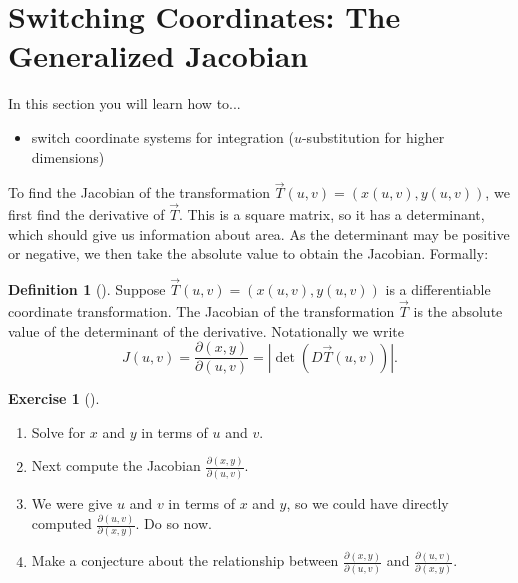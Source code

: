 \documentclass[10pt,]{book}
\theoremstyle{plain}
\theoremstyle{definition}
\newtheorem{definition}[theorem]{Definition}
\theoremstyle{definition}
\theoremstyle{definition}
\theoremstyle{definition}
\newtheorem{exploration}[project]{Exercise}
\theoremstyle{definition}
\numberwithin{equation}{section}
\begin{document}
\section[{Switching Coordinates: The Generalized Jacobian}]{Switching Coordinates: The Generalized Jacobian}\label{section-40}
In this section you will learn how to... \leavevmode%
\begin{itemize}[label=\textbullet]
\item{}switch coordinate systems for integration (\(u\)-substitution for higher dimensions)%
\end{itemize}
%
\par
To find the Jacobian of the transformation \(\vec T(u,v)=(x(u,v), y(u,v))\), we first find the derivative of \(\vec T\). This is a square matrix, so it has a determinant, which should give us information about area. As the determinant may be positive or negative, we then take the absolute value to obtain the Jacobian. Formally:%
\begin{definition}[{}]\label{definition-43}
Suppose \(\vec T(u,v)=(x(u,v),y(u,v))\) is a differentiable coordinate transformation. The Jacobian of the transformation \(\vec T\) is the absolute value of the determinant of the derivative. Notationally we write%
\begin{equation*}
J(u,v) = \frac{\partial (x,y)}{\partial (u,v)} = |\det(D\vec T(u,v))|.
\end{equation*}
%
\end{definition}
\begin{exploration}[]\label{exploration-268}
\leavevmode%
\begin{enumerate}[font=\bfseries,label=(\alph*),ref=\alph*]
\item\label{task-722} Solve for \(x\) and \(y\) in terms of \(u\) and \(v\).%
\item\label{task-723} Next compute the Jacobian \(\frac{\partial (x,y)}{\partial (u,v)}\).%
\item\label{task-724} We were give \(u\) and \(v\) in terms of \(x\) and \(y\), so we could have directly computed \(\frac{\partial (u,v)}{\partial (x,y)}\). Do so now.%
\item\label{task-725} Make a conjecture about the relationship between \(\frac{\partial (x,y)}{\partial (u,v)}\) and \(\frac{\partial (u,v)}{\partial (x,y)}\).%
\end{enumerate}
\end{exploration}
\end{document}
